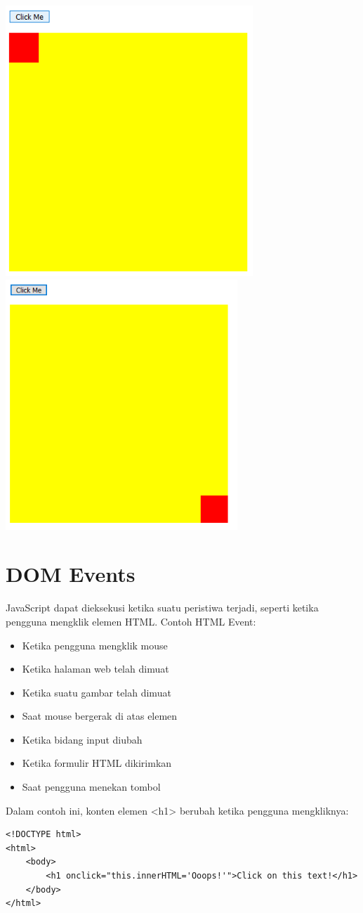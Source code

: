 \documentclass[a4paper,12pt]{article}
\begin{document}
\begin{center}
    \includegraphics[scale=.7]{anim1.png} 
    \includegraphics[scale=.7]{anim2.png} 
\end{center}

\section*{DOM Events}
JavaScript dapat dieksekusi ketika suatu peristiwa terjadi, seperti ketika pengguna mengklik elemen HTML.\@
Contoh HTML Event:
\begin{itemize}
 \item Ketika pengguna mengklik mouse
 \item Ketika halaman web telah dimuat
 \item Ketika suatu gambar telah dimuat
 \item Saat mouse bergerak di atas elemen
 \item Ketika bidang input diubah
 \item Ketika formulir HTML dikirimkan
 \item Saat pengguna menekan tombol
\end{itemize}
Dalam contoh ini, konten elemen <h1> berubah ketika pengguna mengkliknya:
\begin{lstlisting}
<!DOCTYPE html>
<html>
    <body>
        <h1 onclick="this.innerHTML='Ooops!'">Click on this text!</h1>
    </body>
</html>
\end{lstlisting}
\end{document}
